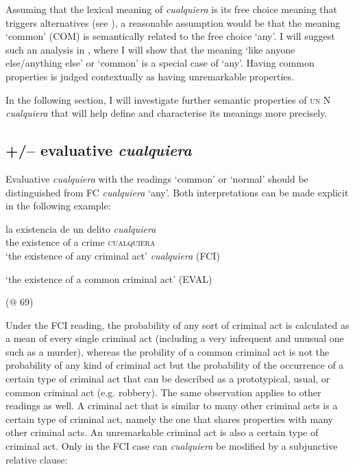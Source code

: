 {Assuming that the lexical meaning of \textit{cualquiera} is its free choice meaning that triggers alternatives (see ), a reasonable assumption would be that the meaning ‘common’ (COM) is semantically related to the free choice ‘any’. I will suggest such an analysis in , where I will show that the meaning ‘like anyone else/anything else’ or ‘common’ is a special case of ‘any’. Having common properties is judged contextually as having unremarkable properties.

In the following section, I will investigate further semantic properties of \textsc{un} N \textit{cualquiera} that will help define and characterise its meanings more precisely.

\subsection{{+/–} {evaluative} {\textit{cualquiera}}} \label{sec:3.2.4}

Evaluative \textit{cualquiera} with the readings ‘common’ or ‘normal’ should be distinguished from FC \textit{cualquiera} ‘any’. Both interpretations can be made explicit in the following example:

\ea \label{ex:key:142} %
\gll la existencia de un delito \textit{cualquiera}\\
the existence of a crime \textsc{cualquiera}\\
\glt ‘the existence of any criminal act’                                     \textit{cualquiera} (FCI)

\glt ‘the existence of a common criminal act’ (EVAL)

  (@ 69)
\z

Under the FCI reading, the probability of any sort of criminal act is calculated as a mean of every single criminal act (including a very infrequent and unusual one such as a murder), whereas the probility of a common criminal act is not the probability of any kind of criminal act but the probability of the occurrence of a certain type of criminal act that can be described as a prototypical, usual, or common criminal act (e.g. robbery). The same observation applies to other readings as well. A criminal act that is similar to many other criminal acts is a certain type of criminal act, namely the one that shares properties with many other criminal acts. An unremarkable criminal act is also a certain type of criminal act. Only in the FCI case can \textit{cualquiera} be modified by a subjunctive relative clause:

}
